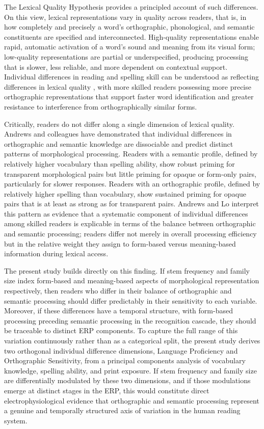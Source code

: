 \documentclass[utf8]{FrontiersinHarvard} %
\begin{document}
The Lexical Quality Hypothesis \citep{CITATION} provides a principled account of such differences. On this view, lexical representations vary in quality across readers, that is, in how completely and precisely a word's orthographic, phonological, and semantic constituents are specified and interconnected. High-quality representations enable rapid, automatic activation of a word's sound and meaning from its visual form; low-quality representations are partial or underspecified, producing processing that is slower, less reliable, and more dependent on contextual support. Individual differences in reading and spelling skill can be understood as reflecting differences in lexical quality \citep{CITATION}, with more skilled readers possessing more precise orthographic representations that support faster word identification and greater resistance to interference from orthographically similar forms.

Critically, readers do not differ along a single dimension of lexical quality. Andrews and colleagues \citep{CITATION} have demonstrated that individual differences in orthographic and semantic knowledge are dissociable and predict distinct patterns of morphological processing. Readers with a semantic profile, defined by relatively higher vocabulary than spelling ability, show robust priming for transparent morphological pairs but little priming for opaque or form-only pairs, particularly for slower responses. Readers with an orthographic profile, defined by relatively higher spelling than vocabulary, show sustained priming for opaque pairs that is at least as strong as for transparent pairs. Andrews and Lo \citeyearpar{CITATION} interpret this pattern as evidence that a systematic component of individual differences among skilled readers is explicable in terms of the balance between orthographic and semantic processing; readers differ not merely in overall processing efficiency but in the relative weight they assign to form-based versus meaning-based information during lexical access.

The present study builds directly on this finding. If stem frequency and family size index form-based and meaning-based aspects of morphological representation respectively, then readers who differ in their balance of orthographic and semantic processing should differ predictably in their sensitivity to each variable. Moreover, if these differences have a temporal structure, with form-based processing preceding semantic processing in the recognition cascade, they should be traceable to distinct ERP components. To capture the full range of this variation continuously rather than as a categorical split, the present study derives two orthogonal individual difference dimensions, Language Proficiency and Orthographic Sensitivity, from a principal components analysis of vocabulary knowledge, spelling ability, and print exposure. If stem frequency and family size are differentially modulated by these two dimensions, and if those modulations emerge at distinct stages in the ERP, this would constitute direct electrophysiological evidence that orthographic and semantic processing represent a genuine and temporally structured axis of variation in the human reading system.
\end{document}
